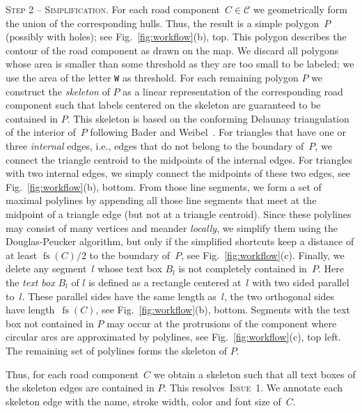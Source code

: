 \documentclass[a4paper,11pt]{article}
\DeclareMathOperator{\lFont}{fs}
\newcommand{\ILanes}{\textsc{Issue~1}\xspace}
\begin{document}
\textsc{Step 2 -- Simplification.} For each road component~$C\in \mathcal C$ we geometrically form the
union of the corresponding hulls. Thus, the result is a simple
polygon~$P$ (possibly with holes); see Fig.~\ref{fig:workflow}(b),
top. This polygon describes the contour of the road component as drawn on the map. We discard all polygons whose area is smaller
than some threshold as they are too small to be labeled; we use the
area of the letter \texttt{W} as threshold. For each remaining polygon $P$ we
construct the \emph{skeleton} of $P$ as a linear representation of the
corresponding road component such that labels centered on the skeleton
are guaranteed to be contained in $P$.  This skeleton is based on the
conforming Delaunay triangulation of the interior of~$P$ following
Bader and Weibel~\cite{Bader97}. For triangles that have one or three
\emph{internal} edges, i.e., edges that do not belong to the boundary
of~$P$, we connect the triangle centroid to the midpoints of the
internal edges. For triangles with two internal edges, we simply
connect the midpoints of these two edges, see
Fig.~\ref{fig:workflow}(b), bottom. From those line segments, we form
a set of maximal polylines by appending all those line segments that
meet at the midpoint of a triangle edge (but not at a triangle
centroid). Since these polylines may consist of many vertices and meander \emph{locally}, we simplify them using the Douglas-Peucker
algorithm, but only if the simplified shortcuts keep a distance of at
least $\lFont(C)/2$ to the boundary of~$P$, see
Fig.~\ref{fig:workflow}(c).  Finally, we delete any segment~$l$ whose
text box $B_l$ is not completely contained in~$P$. Here the \emph{text
  box} $B_l$ of $l$ is defined as a rectangle centered at~$l$ with two
sided parallel to~$l$. These parallel sides have the same length as~$l$, the two orthogonal sides have length~$\lFont(C)$, see
Fig.~\ref{fig:workflow}(b), bottom.  Segments with the text box not
contained in $P$ may occur at the protrusions of the component where
circular arcs are approximated by polylines, see
Fig.~\ref{fig:workflow}(c), top left.  The remaining set of polylines
forms the skeleton of $P$.







Thus, for each road component~$C$ we obtain a skeleton such that all text
boxes of the skeleton edges are contained in $P$. This resolves~\ILanes. We annotate each skeleton edge with the name, stroke width, color and font size of~$C$.
\end{document}
